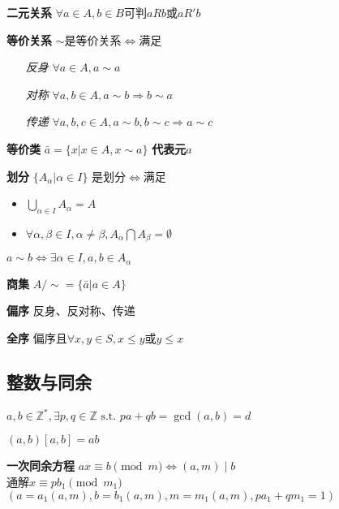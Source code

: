 \documentclass[a4paper,10pt]{ctexart}
\newcommand*{\setZ}{\mathbb{Z}}
\newcommand*{\st}{\text{ s.t. }}
\newcommand*{\impl}{\Rightarrow}
\renewcommand*{\iff}{\Leftrightarrow}
\renewcommand*{\leq}{\leqslant}
\begin{document}
\begin{multicols}{3}
    \textbf{二元关系} $\forall a \!\in\! A, b \!\in\! B$可判$\!aRb\!$或$\!aR'b\!$

    \textbf{等价关系} $\sim$是等价关系$\iff$满足

    \begin{itemize}
        \item[\emph{反身}] $\forall a \!\in\! A, a \sim a$
        \item[\emph{对称}] $\forall a, b \!\in\! A, a \sim b \impl b \sim a$
        \item[\emph{传递}] $\forall a, b, c \!\in\! A, a \sim b, b \sim c \impl a \sim c $
    \end{itemize}

    \textbf{等价类} $\bar{a} = \{ x | x \in A, x \sim a \}$ \textbf{代表元}$a$

    \textbf{划分} $\{ A_\alpha | \alpha \in I \}$ 是划分$\iff$满足

    \begin{itemize}
        \item $\bigcup\limits_{\alpha \in I} A_\alpha = A$
        \item $\forall \alpha, \beta \in I, \alpha \ne \beta, A_\alpha \bigcap A_\beta = \emptyset$
    \end{itemize}

    \begin{theorem}[等价与划分]
        $a \sim b \iff \exists \alpha \in I, a, b \in A_\alpha$
    \end{theorem}

    \textbf{商集} $A/\sim = \{ \bar{a} | a \in A \}$

    \textbf{偏序} 反身、反对称、传递

    \textbf{全序} 偏序且$\forall x, y \in S, x \leq y$或$y \leq x$

    \subsection{整数与同余}

    \begin{theorem}[Bézout定理]
        $a, b \in \setZ^*, \exists p, q \in \setZ \st pa + qb = \gcd(a, b) = d$
    \end{theorem}

    \begin{theorem}
        $(a, b)[a, b] = ab$
    \end{theorem}

    \textbf{一次同余方程} $ax \!\equiv\! b \pmod{m} \iff (a, m) \!\mid\! b$\\
    通解$x \equiv pb_1 \pmod{m_1}$ $(a = a_1(a, m), b = b_1(a, m), m = m_1(a, m), pa_1 +qm_1 = 1)$


\end{multicols}
\end{document}
